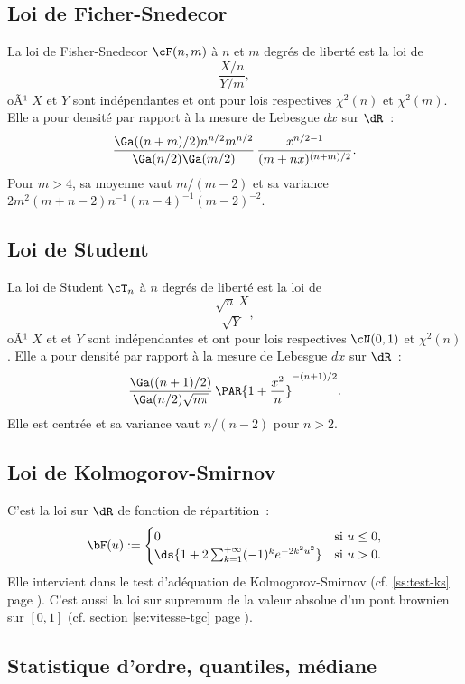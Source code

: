 {{%
\subsection{Loi de Ficher-Snedecor}\label{ss:loi:fisher-snedecor}
%

La loi de Fisher-Snedecor $\cF(n,m)$ à $n$ et $m$ degrés de liberté est la loi
de
$$
\frac{X/n}{Y/m},
$$
oÃ¹ $X$ et $Y$ sont indépendantes et ont pour lois respectives $\chi^2(n)$
et $\chi^2(m)$. Elle a pour densité par rapport à la mesure de Lebesgue $dx$
sur $\dR$~:
$$
\frac{\Ga((n+m)/2) n^{n/2}
  m^{n/2}}{\Ga(n/2)\Ga(m/2)}\,\frac{x^{n/2-1}}{(m+nx)^{(n+m)/2}}.
$$
Pour $m>4$, sa moyenne vaut $m/(m-2)$ et sa variance
$2m^2(m+n-2)n^{-1}(m-4)^{-1}(m-2)^{-2}$.

%
\subsection{Loi de Student}\label{ss:loi:student}
%

La loi de Student $\cT_n$ à $n$ degrés de liberté est la loi de
$$
\frac{\sqrt{n}\,X}{\sqrt{Y}},
$$
oÃ¹ $X$ et et $Y$ sont indépendantes et ont pour lois respectives $\cN(0,1)$
et $\chi^2(n)$. Elle a pour densité par rapport à la mesure de Lebesgue $dx$ sur
$\dR$~:
$$
\frac{\Ga((n+1)/2)}{\Ga(n/2)\sqrt{n\pi}}\,\PAR{1+\frac{x^2}{n}}^{-(n+1)/2}.
$$
Elle est centrée et sa variance vaut $n/(n-2)$ pour $n>2$.

%
\subsection{Loi de Kolmogorov-Smirnov}\label{ss:loi:kolmogorov-smirnov}
%

C'est la loi sur $\dR$ de fonction de répartition~:
$$
\bF(u):=
\begin{cases}
  0 & \text{si } u\leq0,\\
  \ds{1+2 \sum_{k=1}^{+\infty} (-1)^k e^{-2k^2u^2}} & \text{si } u>0.
\end{cases}
$$
Elle intervient dans le test d'adéquation de Kolmogorov-Smirnov (cf.
\ref{ss:test-ks} page \pageref{ss:test-ks}). C'est aussi la loi sur supremum
de la valeur absolue d'un pont brownien sur $[0,1]$ (cf. section
\ref{se:vitesse-tgc} page \pageref{se:vitesse-tgc}).

%
\subsection{Statistique d'ordre, quantiles, médiane}\label{ss:loi:statordre}
%

}}
